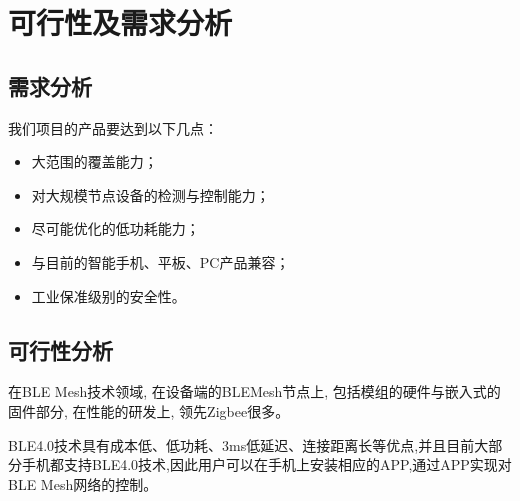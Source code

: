 \chapter{可行性及需求分析}

\section{需求分析}
我们项目的产品要达到以下几点：
  \begin{itemize}
    \item 大范围的覆盖能力；
    \item 对大规模节点设备的检测与控制能力；
    \item 尽可能优化的低功耗能力；
    \item 与目前的智能手机、平板、PC产品兼容；
    \item 工业保准级别的安全性。
  \end{itemize}
\section{可行性分析}
在BLE Mesh技术领域, 在设备端的BLEMesh节点上, 包括模组的硬件与嵌入式的固件部分, 在性能的研发上, 领先Zigbee很多。

BLE4.0技术具有成本低、低功耗、3ms低延迟、连接距离长等优点,并且目前大部分手机都支持BLE4.0技术,因此用户可以在手机上安装相应的APP,通过APP实现对BLE Mesh网络的控制。\cite{compareblezig}